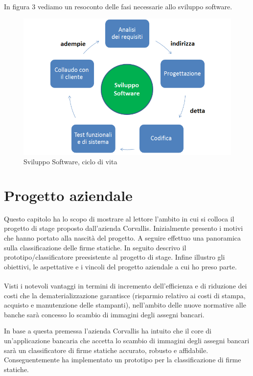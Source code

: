 In figura 3 vediamo un resoconto delle fasi necessarie allo sviluppo software.
\begin{figure}[h!]
\centering
\includegraphics[scale=0.55]{../Logo&Header/sviluppoSoftware.png}
\caption{ Sviluppo Software, ciclo di vita}
\end{figure}

\newpage
\newpage

\section{Progetto aziendale}
\label{2.0}
Questo capitolo ha lo scopo di mostrare al lettore l'ambito in cui si colloca il progetto di stage proposto dall'azienda Corvallis. Inizialmente presento i motivi che hanno portato alla nascità del progetto. A seguire effettuo una panoramica sulla classificazione delle firme statiche. In seguito descrivo il prototipo/classificatore preesistente al progetto di stage. Infine illustro gli obiettivi, le aspettative e i vincoli del progetto aziendale a cui ho preso parte.\\\\
Visti i notevoli vantaggi in termini di incremento dell'efficienza e di riduzione dei costi che la dematerializzazione garantisce (risparmio relativo ai costi di stampa, acquisto e manutenzione delle stampanti), nell'ambito delle nuove normative alle banche sarà concesso lo scambio di immagini degli assegni bancari. 

In base a questa premessa l'azienda Corvallis ha intuito che il core di un'applicazione bancaria che accetta lo scambio di immagini degli assegni bancari sarà un classificatore di firme statiche accurato, robusto e affidabile. Conseguentemente ha implementato un prototipo per la classificazione di firme statiche.

